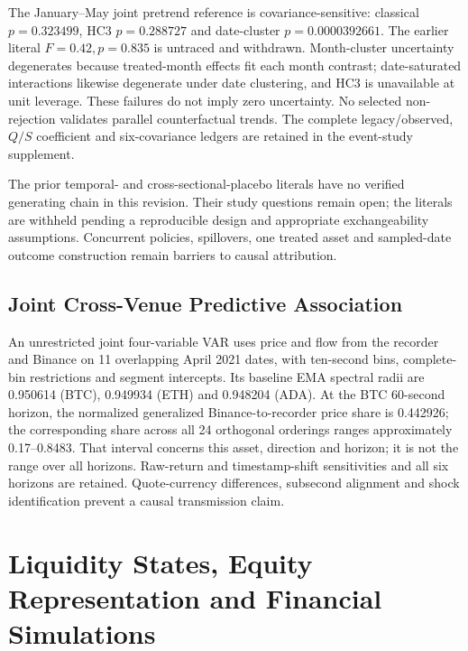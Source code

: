 \documentclass[12pt]{article}
\theoremstyle{definition}
\theoremstyle{remark}
\begin{document}
The January--May joint pretrend reference is covariance-sensitive: classical $p=0.323499$, HC3 $p=0.288727$ and date-cluster $p=0.0000392661$. The earlier literal $F=0.42,p=0.835$ is untraced and withdrawn. Month-cluster uncertainty degenerates because treated-month effects fit each month contrast; date-saturated interactions likewise degenerate under date clustering, and HC3 is unavailable at unit leverage. These failures do not imply zero uncertainty. No selected non-rejection validates parallel counterfactual trends. The complete legacy/observed, $Q/S$ coefficient and six-covariance ledgers are retained in the event-study supplement.

The prior temporal- and cross-sectional-placebo literals have no verified generating chain in this revision. Their study questions remain open; the literals are withheld pending a reproducible design and appropriate exchangeability assumptions. Concurrent policies, spillovers, one treated asset and sampled-date outcome construction remain barriers to causal attribution.


\subsection{Joint Cross-Venue Predictive Association}
\label{sec:cross_venue_verified}
An unrestricted joint four-variable VAR uses price and flow from the recorder and Binance on 11 overlapping April 2021 dates, with ten-second bins, complete-bin restrictions and segment intercepts. Its baseline EMA spectral radii are 0.950614 (BTC), 0.949934 (ETH) and 0.948204 (ADA). At the BTC 60-second horizon, the normalized generalized Binance-to-recorder price share is 0.442926; the corresponding share across all 24 orthogonal orderings ranges approximately 0.17--0.8483. That interval concerns this asset, direction and horizon; it is not the range over all horizons. Raw-return and timestamp-shift sensitivities and all six horizons are retained. Quote-currency differences, subsecond alignment and shock identification prevent a causal transmission claim.

\section{Liquidity States, Equity Representation and Financial Simulations}
\label{sec:stress_fragility}
\end{document}
